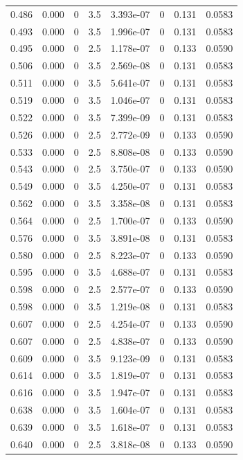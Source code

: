 \documentclass[preview]{standalone}
\begin{document}
{{{\begin{tabular}{L{1.2cm}C{1.2cm} C{0.3cm}C{0.5cm} C{1.4cm}C{1.4cm} C{1.4cm}C{1.4cm}}
  0.486  &  0.000  & 0     & 3.5 &  3.393e-07  & 0  & 0.131 &  0.0583   \\ 
  0.493  &  0.000  & 0     & 3.5 &  1.996e-07  & 0  & 0.131 &  0.0583   \\ 
  0.495  &  0.000  & 0     & 2.5 &  1.178e-07  & 0  & 0.133 &  0.0590   \\ 
  0.506  &  0.000  & 0     & 3.5 &  2.569e-08  & 0  & 0.131 &  0.0583   \\ 
  0.511  &  0.000  & 0     & 3.5 &  5.641e-07  & 0  & 0.131 &  0.0583   \\ 
  0.519  &  0.000  & 0     & 3.5 &  1.046e-07  & 0  & 0.131 &  0.0583   \\ 
  0.522  &  0.000  & 0     & 3.5 &  7.399e-09  & 0  & 0.131 &  0.0583   \\ 
  0.526  &  0.000  & 0     & 2.5 &  2.772e-09  & 0  & 0.133 &  0.0590   \\ 
  0.533  &  0.000  & 0     & 2.5 &  8.808e-08  & 0  & 0.133 &  0.0590   \\ 
  0.543  &  0.000  & 0     & 2.5 &  3.750e-07  & 0  & 0.133 &  0.0590   \\ 
  0.549  &  0.000  & 0     & 3.5 &  4.250e-07  & 0  & 0.131 &  0.0583   \\ 
  0.562  &  0.000  & 0     & 3.5 &  3.358e-08  & 0  & 0.131 &  0.0583   \\ 
  0.564  &  0.000  & 0     & 2.5 &  1.700e-07  & 0  & 0.133 &  0.0590   \\ 
  0.576  &  0.000  & 0     & 3.5 &  3.891e-08  & 0  & 0.131 &  0.0583   \\ 
  0.580  &  0.000  & 0     & 2.5 &  8.223e-07  & 0  & 0.133 &  0.0590   \\ 
  0.595  &  0.000  & 0     & 3.5 &  4.688e-07  & 0  & 0.131 &  0.0583   \\ 
  0.598  &  0.000  & 0     & 2.5 &  2.577e-07  & 0  & 0.133 &  0.0590   \\ 
  0.598  &  0.000  & 0     & 3.5 &  1.219e-08  & 0  & 0.131 &  0.0583   \\ 
  0.607  &  0.000  & 0     & 2.5 &  4.254e-07  & 0  & 0.133 &  0.0590   \\ 
  0.607  &  0.000  & 0     & 2.5 &  4.838e-07  & 0  & 0.133 &  0.0590   \\ 
  0.609  &  0.000  & 0     & 3.5 &  9.123e-09  & 0  & 0.131 &  0.0583   \\ 
  0.614  &  0.000  & 0     & 3.5 &  1.819e-07  & 0  & 0.131 &  0.0583   \\ 
  0.616  &  0.000  & 0     & 3.5 &  1.947e-07  & 0  & 0.131 &  0.0583   \\ 
  0.638  &  0.000  & 0     & 3.5 &  1.604e-07  & 0  & 0.131 &  0.0583   \\ 
  0.639  &  0.000  & 0     & 3.5 &  1.618e-07  & 0  & 0.131 &  0.0583   \\ 
  0.640  &  0.000  & 0     & 2.5 &  3.818e-08  & 0  & 0.133 &  0.0590   \\ 
\hline 
\end{tabular} 

}}}
\end{document}
